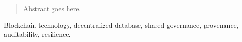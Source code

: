 
\begin{abstract}
Abstract goes here. 
\end{abstract}

\begin{IEEEkeywords}
Blockchain technology, decentralized database, shared governance, provenance, auditability, resilience.
\end{IEEEkeywords}